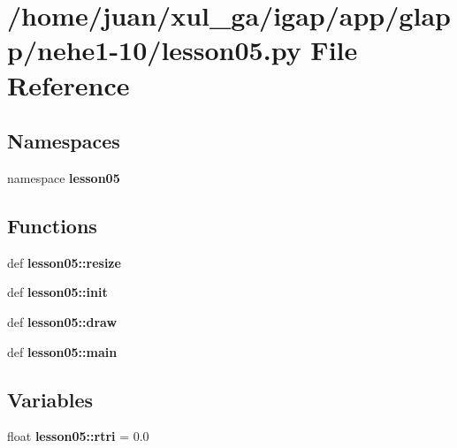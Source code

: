 \section{/home/juan/xul\_\-ga/igap/app/glapp/nehe1-10/lesson05.py File Reference}
\label{nehe1-10_2lesson05_8py}
\subsection*{Namespaces}
\begin{CompactItemize}
\item 
namespace {\bf lesson05}
\end{CompactItemize}
\subsection*{Functions}
\begin{CompactItemize}
\item 
def {\bf lesson05::resize}
\item 
def {\bf lesson05::init}
\item 
def {\bf lesson05::draw}
\item 
def {\bf lesson05::main}
\end{CompactItemize}
\subsection*{Variables}
\begin{CompactItemize}
\item 
float {\bf lesson05::rtri} = 0.0
\end{CompactItemize}
